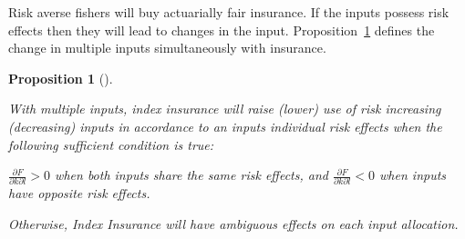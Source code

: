 \documentclass[
  super,
  preprint,
  3p]{elsarticle}
\theoremstyle{plain}
\newtheorem{proposition}{Proposition}[section]
\theoremstyle{plain}
\theoremstyle{remark}
\begin{document}
Risk averse fishers will buy actuarially fair insurance. If the inputs
possess risk effects then they will lead to changes in the input.
Proposition~\ref{prp-samre} defines the change in multiple inputs
simultaneously with insurance.

\begin{proposition}[]\protect\hypertarget{prp-samre}{}\label{prp-samre}

With multiple inputs, index insurance will raise (lower) use of risk
increasing (decreasing) inputs in accordance to an inputs individual
risk effects when the following sufficient condition is true:

\(\frac{\partial F}{\partial k\partial l}>0\) when both inputs share the
same risk effects, and \(\frac{\partial F}{\partial k\partial l}<0\)
when inputs have opposite risk effects.

Otherwise, Index Insurance will have ambiguous effects on each input
allocation.

\end{proposition}
\end{document}
